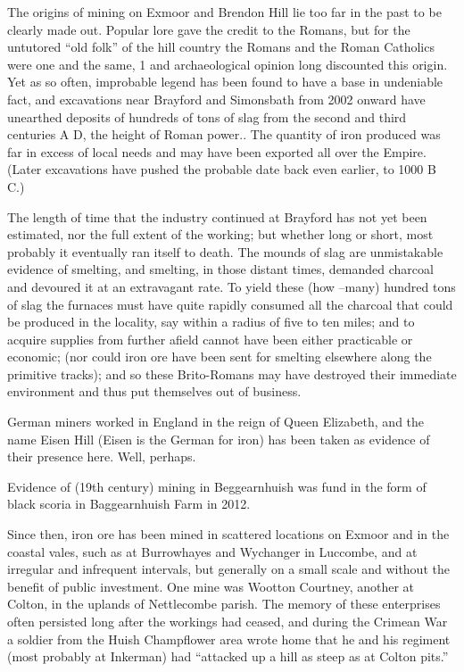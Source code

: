 \documentclass[10pt,a4paper]{article}
\begin{document}
The origins of mining on Exmoor and Brendon Hill lie too far in the past to be clearly made out. Popular lore gave the credit to the Romans, but for the untutored “old folk” of the hill country the Romans and the Roman Catholics were one and the same, 1 and archaeological opinion long discounted this origin. Yet as so often, improbable legend has been found to have a base in undeniable fact, and excavations near Brayford and Simonsbath from 2002 onward have unearthed deposits of hundreds of tons of slag from the second and third centuries A D, the height of Roman power.. The quantity of iron produced was far in excess of local needs and may have been exported all over the Empire.  (Later excavations have pushed the probable date back even earlier, to 1000 B C.)

The length of time that the industry continued at Brayford has not yet been estimated, nor the full extent of the working; but whether long or short, most probably it eventually ran itself to death.  The mounds of slag are unmistakable evidence of smelting, and smelting, in those distant times, demanded charcoal and devoured it at an extravagant rate. To yield these (how –many) hundred tons of slag the furnaces must have quite rapidly consumed all the charcoal that could be produced in the locality, say within a radius of five to ten miles; and to acquire supplies from further afield cannot have been either practicable or economic; (nor could iron ore have been sent for smelting elsewhere along the primitive tracks); and so these Brito-Romans may have destroyed their immediate environment and thus put themselves out of business.

German miners worked in England in the reign of Queen Elizabeth, and the name Eisen Hill (Eisen is the German for iron) has been taken as evidence of their presence here. Well, perhaps.  

Evidence of (19th century) mining in Beggearnhuish was fund in the form of black scoria in Baggearnhuish Farm in 2012.

Since then, iron ore has been mined in scattered locations on Exmoor and in the coastal vales, such as at Burrowhayes and Wychanger in Luccombe, and at irregular and infrequent intervals, but generally on a small scale and without the benefit of public investment.  One mine was Wootton Courtney, another at Colton, in the uplands of Nettlecombe parish. The memory of these enterprises often persisted long after the workings had ceased, and during the Crimean War   a soldier from the Huish Champflower area wrote home that he and his regiment (most probably at Inkerman) had “attacked up a hill as steep as at Colton pits.”
\end{document}
